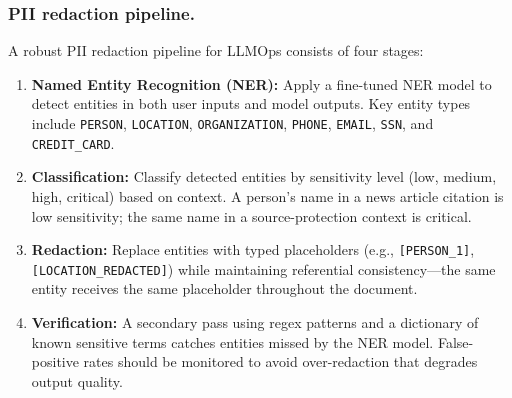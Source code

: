 
\subsubsection{PII redaction pipeline.}

A robust PII redaction pipeline for LLMOps consists of four stages:
\begin{enumerate}
    \item \textbf{Named Entity Recognition (NER):} Apply a fine-tuned NER model to detect entities in both user inputs and model outputs. Key entity types include \texttt{PERSON}, \texttt{LOCATION}, \texttt{ORGANIZATION}, \texttt{PHONE}, \texttt{EMAIL}, \texttt{SSN}, and \texttt{CREDIT\_CARD}.
    \item \textbf{Classification:} Classify detected entities by sensitivity level (low, medium, high, critical) based on context. A person's name in a news article citation is low sensitivity; the same name in a source-protection context is critical.
    \item \textbf{Redaction:} Replace entities with typed placeholders (e.g., \texttt{[PERSON\_1]}, \texttt{[LOCATION\_REDACTED]}) while maintaining referential consistency---the same entity receives the same placeholder throughout the document.
    \item \textbf{Verification:} A secondary pass using regex patterns and a dictionary of known sensitive terms catches entities missed by the NER model. False-positive rates should be monitored to avoid over-redaction that degrades output quality.
\end{enumerate}

